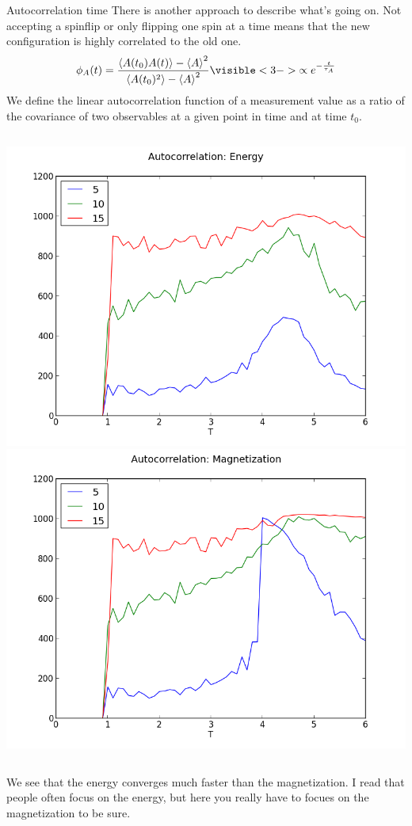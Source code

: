 \documentclass[handout]{beamer}
\begin{document}
\begin{frame}{Autocorrelation time}
 {There is another approach to describe what's going on. Not accepting a spinflip or only flipping one spin at a time means that the new configuration is highly correlated to the old one.}
\pause
\[ \phi_{A}(t) = \frac{\left< A(t_0)A(t) \right> - \left< A \right>^2}{\left< A(t_0)^2 \right> - \left< A \right>^2} \visible<3->{\propto e^{-\frac{t}{\tau_A}}} \]
 {We define the linear autocorrelation function of a measurement value as a ratio of the covariance of two observables at a given point in time and at time \(t_0\).}
\begin{columns}[c]
	\pause[4]
	\includegraphics[width=\textwidth]{../results/measurements/autocorr_energy_single.png}
	\pause[5]
	\includegraphics[width=\textwidth]{../results/measurements/autocorr_magnetization_single.png}
\end{columns}
 {We see that the energy converges much faster than the magnetization. I read that people often focus on the energy, but here you really have to focues on the magnetization to be sure.}
\end{frame}
\end{document}
